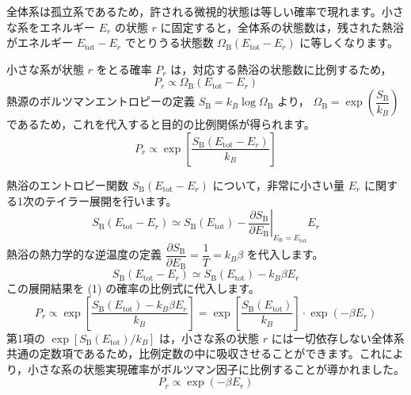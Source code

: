 \solutionheading
\begin{solutionparts}

全体系は孤立系であるため，許される微視的状態は等しい確率で現れます。小さな系をエネルギー $E_r$ の状態 $r$ に固定すると，全体系の状態数は，残された熱浴がエネルギー $E_{\mathrm{tot}}-E_r$ でとりうる状態数 $\Omega_{\mathrm{B}}(E_{\mathrm{tot}} - E_r)$ に等しくなります。
\par
小さな系が状態 $r$ をとる確率 $P_r$ は，対応する熱浴の状態数に比例するため，
\begin{equation*}
P_r \propto \Omega_{\mathrm{B}}(E_{\mathrm{tot}} - E_r)
\end{equation*}
熱源のボルツマンエントロピーの定義 $S_{\mathrm{B}} = k_B \log \Omega_{\mathrm{B}}$ より， $\Omega_{\mathrm{B}} = \exp\left( \dfrac{S_{\mathrm{B}}}{k_B} \right)$ であるため，これを代入すると目的の比例関係が得られます。
\begin{equation*}
P_r \propto \exp\left[ \frac{S_{\mathrm{B}}(E_{\mathrm{tot}} - E_r)}{k_B} \right]
\end{equation*}

熱浴のエントロピー関数 $S_{\mathrm{B}}(E_{\mathrm{tot}} - E_r)$ について，非常に小さい量 $E_r$ に関する1次のテイラー展開を行います。
\begin{equation*}
S_{\mathrm{B}}(E_{\mathrm{tot}} - E_r) \simeq S_{\mathrm{B}}(E_{\mathrm{tot}}) - \left. \frac{\partial S_{\mathrm{B}}}{\partial E_{\mathrm{B}}} \right|_{E_{\mathrm{B}} = E_{\mathrm{tot}}} E_r
\end{equation*}
熱浴の熱力学的な逆温度の定義 $\dfrac{\partial S_{\mathrm{B}}}{\partial E_{\mathrm{B}}} = \dfrac{1}{T} = k_B \beta$ を代入します。
\begin{equation*}
S_{\mathrm{B}}(E_{\mathrm{tot}} - E_r) \simeq S_{\mathrm{B}}(E_{\mathrm{tot}}) - k_B \beta E_r
\end{equation*}
この展開結果を (1) の確率の比例式に代入します。
\begin{equation*}
P_r \propto \exp\left[ \frac{S_{\mathrm{B}}(E_{\mathrm{tot}}) - k_B \beta E_r}{k_B} \right] = \exp\left[ \frac{S_{\mathrm{B}}(E_{\mathrm{tot}})}{k_B} \right] \cdot \exp(-\beta E_r)
\end{equation*}
第1項の $\exp[S_{\mathrm{B}}(E_{\mathrm{tot}})/k_B]$ は，小さな系の状態 $r$ には一切依存しない全体系共通の定数項であるため，比例定数の中に吸収させることができます。これにより，小さな系の状態実現確率がボルツマン因子に比例することが導かれました。
\begin{equation*}
P_r \propto \exp(-\beta E_r)
\end{equation*}


\end{solutionparts}
